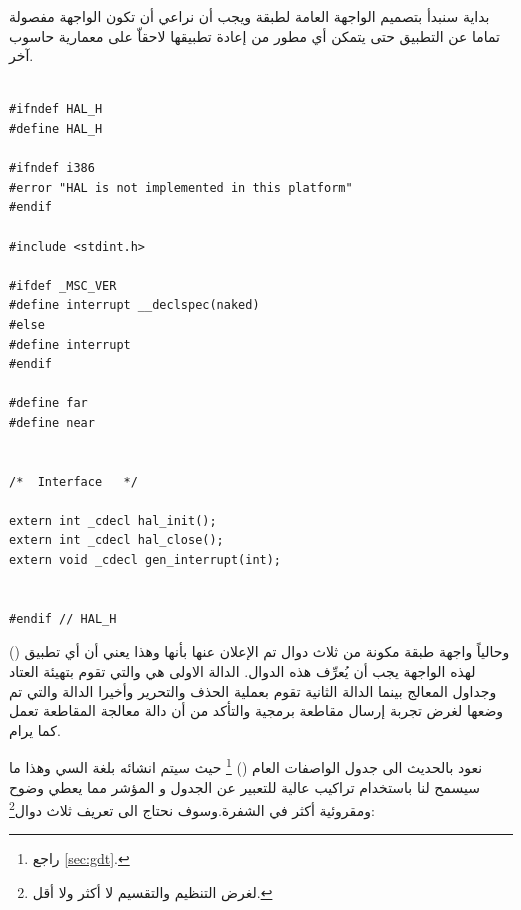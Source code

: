 \documentclass[document.tex]{subfiles}
\begin{document}
بداية سنبدأ بتصميم الواجهة العامة لطبقة  ويجب أن نراعي أن تكون الواجهة مفصولة تماما عن التطبيق حتى يتمكن أي مطور من إعادة تطبيقها لاحقاّ على معمارية حاسوب آخر.


\begin{english}

\lstset{numberstyle=\tiny,numbers=left,stepnumber=1,numbersep=5pt,tabsize=2,extendedchars=true,breaklines=true,frame=b,showspaces=false, showtabs=false,xleftmargin=10pt,framexleftmargin=10pt,framexrightmargin=5pt,framexbottommargin=4pt,showstringspaces=false,language=C++}

\begin{lstlisting}[label=hal_interface,caption=\en{include/hal.h:Hardware Abstraction Layer Interface}]

#ifndef HAL_H
#define HAL_H

#ifndef i386
#error "HAL is not implemented in this platform"
#endif

#include <stdint.h>

#ifdef _MSC_VER
#define interrupt __declspec(naked)
#else
#define interrupt
#endif

#define far
#define near


/*	Interface	*/

extern int _cdecl hal_init();
extern int _cdecl hal_close();
extern void _cdecl gen_interrupt(int);


#endif // HAL_H
\end{lstlisting}
\end{english}

وحالياً واجهة طبقة  مكونة من ثلاث دوال تم الإعلان عنها بأنها  وهذا يعني أن أي تطبيق () لهذه الواجهة يجب أن يُعرِّف هذه الدوال. الدالة الاولى هي  والتي تقوم بتهيئة العتاد وجداول المعالج بينما الدالة الثانية  تقوم بعملية الحذف والتحرير وأخيرا الدالة  والتي تم وضعها لغرض تجربة إرسال مقاطعة برمجية والتأكد من أن دالة معالجة المقاطعة تعمل كما يرام.

نعود بالحديث الى جدول الواصفات العام () \footnote{راجع \ref{sec:gdt}.} حيث سيتم انشائه بلغة السي وهذا ما سيسمح لنا باستخدام تراكيب عالية للتعبير عن الجدول و المؤشر مما يعطي وضوح ومقروئية أكثر في الشفرة.وسوف نحتاج  الى تعريف ثلاث دوال\footnote{لغرض التنظيم والتقسيم لا أكثر ولا أقل.}:
\end{document}
